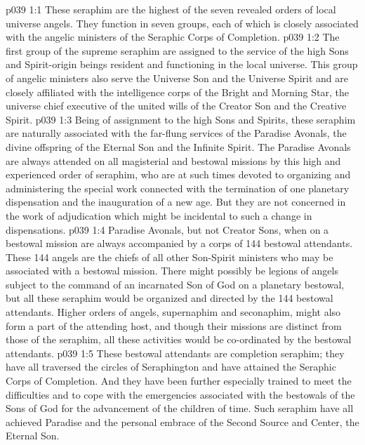\vs p039 1:1 These seraphim are the highest of the seven revealed orders of local universe angels. They function in seven groups, each of which is closely associated with the angelic ministers of the Seraphic Corps of Completion.
\pc \vs p039 1:2 \bibnobreakspace {} The first group of the supreme seraphim are assigned to the service of the high Sons and Spirit\hyp{}origin beings resident and functioning in the local universe. This group of angelic ministers also serve the Universe Son and the Universe Spirit and are closely affiliated with the intelligence corps of the Bright and Morning Star, the universe chief executive of the united wills of the Creator Son and the Creative Spirit.
\vs p039 1:3 Being of assignment to the high Sons and Spirits, these seraphim are naturally associated with the far\hyp{}flung services of the Paradise Avonals, the divine offspring of the Eternal Son and the Infinite Spirit. The Paradise Avonals are always attended on all magisterial and bestowal missions by this high and experienced order of seraphim, who are at such times devoted to organizing and administering the special work connected with the termination of one planetary dispensation and the inauguration of a new age. But they are not concerned in the work of adjudication which might be incidental to such a change in dispensations.
\pc \vs p039 1:4  Paradise Avonals, but not Creator Sons, when on a bestowal mission are always accompanied by a corps of 144 bestowal attendants. These 144 angels are the chiefs of all other Son\hyp{}Spirit ministers who may be associated with a bestowal mission. There might possibly be legions of angels subject to the command of an incarnated Son of God on a planetary bestowal, but all these seraphim would be organized and directed by the 144 bestowal attendants. Higher orders of angels, supernaphim and seconaphim, might also form a part of the attending host, and though their missions are distinct from those of the seraphim, all these activities would be co\hyp{}ordinated by the bestowal attendants.
\vs p039 1:5 These bestowal attendants are completion seraphim; they have all traversed the circles of Seraphington and have attained the Seraphic Corps of Completion. And they have been further especially trained to meet the difficulties and to cope with the emergencies associated with the bestowals of the Sons of God for the advancement of the children of time. Such seraphim have all achieved Paradise and the personal embrace of the Second Source and Center, the Eternal Son.
